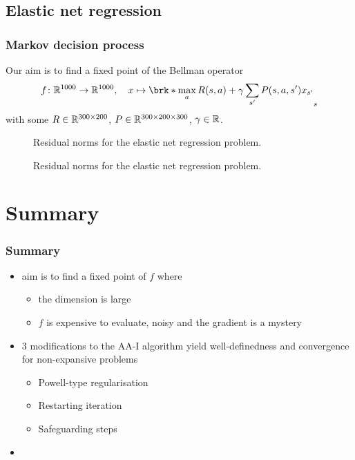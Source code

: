 \subsection{Elastic net regression}

\begin{frame}
	\frametitle{Markov decision process}
	Our aim is to find a fixed point of the Bellman operator
	\begin{align*}
		f\colon\R^{1000}\to\R^{1000}, \quad x\mapsto \brk*{\max_{a}R(s,a)+\gamma \sum_{s'}P(s,a,s')x_{s'}}_{s}
	\end{align*}
	with some $R\in\mathbb{R}^{300\times 200}$, $P\in\mathbb{R}^{300\times 200\times 300}$, $\gamma\in\mathbb{R}$.
\end{frame}


\begin{frame}
	\begin{figure}
		\centering
		{\scriptsize
		
		}
		\caption{Residual norms for the elastic net regression problem.}
	\end{figure}
\end{frame}

\begin{frame}
	\begin{figure}
		\centering
		{\scriptsize
		
		}
		\caption{Residual norms for the elastic net regression problem.}
	\end{figure}
\end{frame}

\section{Summary}

\begin{frame}
	\frametitle{Summary}
	\begin{itemize}
		\item aim is to find a fixed point of $f$ where
		\begin{itemize}
			\item the dimension is large
			\item $f$ is expensive to evaluate, noisy and the gradient is a mystery
		\end{itemize}
		\item 3 modifications to the AA-I algorithm yield well-definedness and convergence for non-expansive problems
		\begin{itemize}
			\item Powell-type regularisation
			\item Restarting iteration
			\item Safeguarding steps
		\end{itemize}
		\item 
	\end{itemize}
\end{frame}

